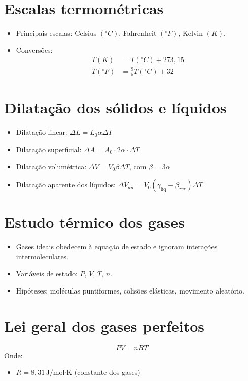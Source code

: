 \documentclass[a4paper,12pt]{article}
\begin{document}
\begin{multicols}{2}
\section{Escalas termométricas}

\begin{itemize}
    \item Principais escalas: Celsius $(^\circ C)$, Fahrenheit $(^\circ F)$, Kelvin $(K)$.
    \item Conversões:
    \begin{align*}
        T(K) &= T(^\circ C) + 273{,}15 \\
        T(^\circ F) &= \frac{9}{5}T(^\circ C) + 32
    \end{align*}
\end{itemize}

\section{Dilatação dos sólidos e líquidos}
\begin{itemize}
    \item Dilatação linear: $\Delta L = L_0 \alpha \Delta T$
    \item Dilatação superficial: $\Delta A = A_0 \cdot 2\alpha \cdot \Delta T$
    \item Dilatação volumétrica: $\Delta V = V_0 \beta \Delta T$, com $\beta = 3\alpha$
    \item Dilatação aparente dos líquidos: $\Delta V_{ap}$  = $V_0 (\gamma_{\text{líq}} -\beta_{rec}) \Delta T$
\end{itemize}

\section{Estudo térmico dos gases}
\begin{itemize}
    \item Gases ideais obedecem à equação de estado e ignoram interações intermoleculares.
    \item Variáveis de estado: $P$, $V$, $T$, $n$.
    \item Hipóteses: moléculas puntiformes, colisões elásticas, movimento aleatório.
\end{itemize}

\section{Lei geral dos gases perfeitos}
\begin{equation}
    PV = nRT
\end{equation}
Onde:
\begin{itemize}
    \item $R = 8{,}31 \, \text{J/mol·K}$ (constante dos gases)
\end{itemize}


\end{multicols}
\end{document}
